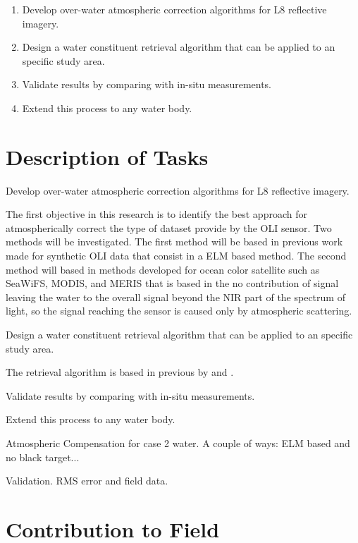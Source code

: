 \begin{enumerate}
	\item Develop over-water atmospheric correction algorithms for L8 reflective imagery.
	\item Design a water constituent retrieval algorithm that can be applied to an specific study area.
	\item Validate results by comparing with in-situ measurements.
	\item Extend this process to any water body.
\end{enumerate}

\section{Description of Tasks}
\label{sec:tasks}
\begin{enumerate}
	{\bf \item Develop over-water atmospheric correction algorithms for L8 reflective imagery.} 

The first objective in this research is to identify the best approach for atmospherically correct the type of dataset provide by the OLI sensor. Two methods will be investigated. The first method will be based in previous work made for synthetic OLI data \cite{Gerace:2013,Gerace:2012,GeraceThesis} that consist in a ELM based method. The second method will based in methods developed for ocean color satellite such as SeaWiFS, MODIS, and MERIS \cite{Gordon:1997} that is based in the no contribution of signal leaving the water to the overall signal beyond the NIR part of the spectrum of light, so the signal reaching the sensor is caused only by atmospheric scattering.

	{\bf \item Design a water constituent retrieval algorithm that can be applied to an specific study area.}

	The retrieval algorithm is based in previous by \cite{Raqueno:2003} and \cite{GeraceThesis}.


	{\bf \item Validate results by comparing with in-situ measurements.}


	{\bf \item Extend this process to any water body.}


\end{enumerate}


Atmospheric Compensation for case 2 water. A couple of ways: ELM based and no black target...

Validation. RMS error and field data.

\section{Contribution to Field}
\label{sec:contributiontofield}